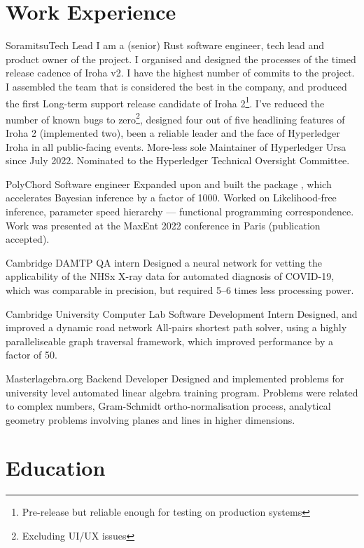 \documentclass{CurriculumVitae}[10pt, condensed]
\begin{document}
\section*{Work Experience} {%
  \setlength{\parindent}{0in}%

   {Soramitsu}{Tech Lead} {I am a (senior) Rust
    software engineer, tech lead and product owner of the project.  I
    organised and designed the processes of the timed release cadence
    of Iroha v2. I have the highest number of commits to the project.
    I assembled the team that is considered the best in the company,
    and produced the first Long-term support release candidate of
    Iroha 2\footnote{Pre-release but reliable enough for testing on
      production systems}. I've reduced the number of known bugs to
    zero\footnote{Excluding UI/UX issues}, designed four out of five
    headlining features of Iroha 2 (implemented two), been a reliable
    leader and the face of Hyperledger Iroha in all public-facing
    events. More-less sole Maintainer of Hyperledger Ursa since July
    2022. Nominated to the Hyperledger Technical Oversight
    Committee. }

   {PolyChord} {Software
    engineer} { Expanded upon and built the package ,
    which accelerates Bayesian inference by a factor of 1000. Worked
    on Likelihood-free inference, parameter speed hierarchy ---
    functional programming correspondence. Work was presented at the
    MaxEnt 2022 conference in Paris (publication accepted).  }

   {Cambridge DAMTP} {QA intern} {Designed a
    neural network for vetting the applicability of the NHSx X-ray
    data for automated diagnosis of COVID-19, which was comparable in
    precision, but required 5--6 times less processing power.  }

   {Cambridge University Computer Lab}
  {Software Development Intern} {Designed, and improved a dynamic road
    network All-pairs shortest path solver, using a highly
    paralleliseable graph traversal framework, which improved
    performance by a factor of 50.  }

  {Masterlagebra.org} {Backend Developer} {Designed and implemented
    problems for university level automated linear algebra training
    program. Problems were related to complex numbers, Gram-Schmidt
    ortho-normalisation process, analytical geometry problems
    involving planes and lines in higher dimensions.  }
  \pagebreak{} \section*{Education}%

}
\end{document}
